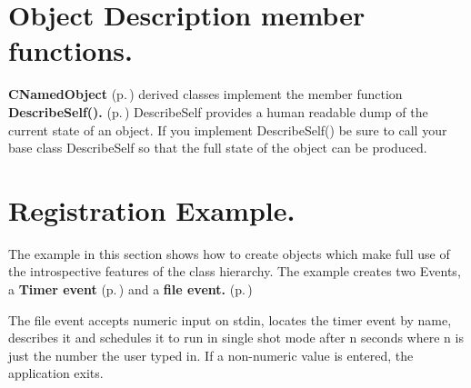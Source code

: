 \section{Object Description member functions.}\label{SelfDescription}


{\bf CNamed\-Object} {\rm (p.\,\pageref{classCNamedObject})} derived classes implement the member function  {\bf Describe\-Self().} {\rm (p.\,\pageref{classCNamedObject_a8})} Describe\-Self provides a human readable dump of the current state of an object. If you implement Describe\-Self() be sure to call your base class Describe\-Self so that the full state of the object can be produced.

\section{Registration Example.}\label{regExample}


The example in this section shows how to create objects which make full use of the introspective features of the class hierarchy. The example creates two Events, a {\bf Timer event} {\rm (p.\,\pageref{classCTimerEvent})} and a {\bf file event.} {\rm (p.\,\pageref{classCFileEvent})}

The file event accepts numeric input on stdin, locates the timer event by name, describes it and schedules it to run in single shot mode after n seconds where n is just the number the user typed in. If a non-numeric value is entered, the application exits.



